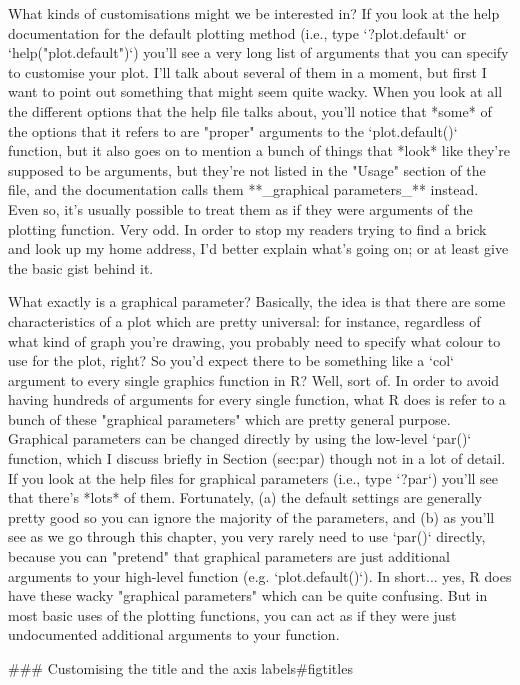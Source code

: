What kinds of customisations might we be interested in? If you look at the help documentation for the default plotting method (i.e., type `?plot.default` or `help("plot.default")`) you'll see a very long list of arguments that you can specify to customise your plot. I'll talk about several of them in a moment, but first I want to point out something that might seem quite wacky. When you look at all the different options that the help file talks about, you'll notice that *some* of the options that it refers to are "proper" arguments to the `plot.default()` function, but it also goes on to mention a bunch of things that *look* like they're supposed to be arguments, but they're not listed in the "Usage" section of the file, and the documentation calls them **_graphical parameters_** instead. Even so, it's usually possible to treat them as if they were arguments of the plotting function. Very odd. In order to stop my readers trying to find a brick and look up my home address, I'd better explain what's going on; or at least give the basic gist behind it. 

What exactly is a graphical parameter? Basically, the idea is that there are some characteristics of a plot which are pretty universal: for instance, regardless of what kind of graph you're drawing, you probably need to specify what colour to use for the plot, right? So you'd expect there to be something like a `col` argument to every single graphics function in R? Well, sort of. In order to avoid having hundreds of arguments for every single function, what R does is refer to a bunch of these "graphical parameters" which are pretty general purpose. Graphical parameters can be changed directly by using the low-level `par()` function, which I discuss briefly in Section \@ref(sec:par) though not in a lot of detail. If you look at the help files for graphical parameters (i.e., type `?par`) you'll see that there's *lots* of them. Fortunately, (a) the default settings are generally pretty good so you can ignore the majority of the parameters, and (b) as you'll see as we go through this chapter, you very rarely need to use `par()` directly, because you can "pretend" that graphical parameters are just additional arguments to your high-level function (e.g. `plot.default()`). In short... yes, R does have these wacky "graphical parameters" which can be quite confusing. But in most basic uses of the plotting functions, you can act as if they were just undocumented additional arguments to your function.

### Customising the title and the axis labels{#figtitles}

